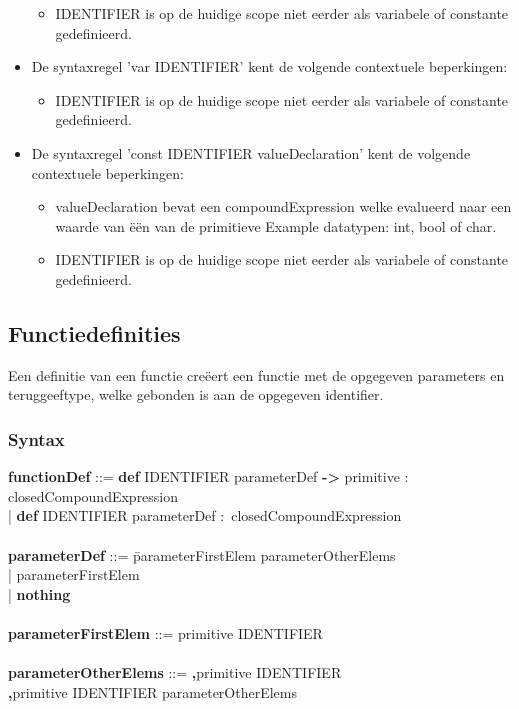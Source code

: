 \begin{itemize}
\begin{itemize}
            \item IDENTIFIER is op de huidige scope niet eerder als variabele of constante gedefinieerd.
            \end{itemize}  
        \item De syntaxregel 'var IDENTIFIER' kent de volgende contextuele beperkingen:
            \begin{itemize}
             \item IDENTIFIER is op de huidige scope niet eerder als variabele of constante gedefinieerd.
            \end{itemize}  
        \item De syntaxregel 'const IDENTIFIER valueDeclaration' kent de volgende contextuele beperkingen:
            \begin{itemize}
            \item valueDeclaration bevat een compoundExpression welke evalueerd naar een waarde van \"{e}\"{e}n van de primitieve Example datatypen: int, bool of char.
            \item IDENTIFIER is op de huidige scope niet eerder als variabele of constante gedefinieerd.
            \end{itemize}  
        \end{itemize}

\subsection{Functiedefinities}
Een definitie van een functie cre\"{e}ert een functie met de opgegeven parameters en teruggeeftype, welke gebonden is aan de opgegeven identifier.
    \subsubsection{Syntax}
        \begin{tabbing}
            {\bf functionDef}                 ::= \= \textbf{def} IDENTIFIER parameterDef \textbf{->} primitive \textbf{$\colon$} closedCompoundExpression\\
                                                  \>| \textbf{def} IDENTIFIER parameterDef \textbf{$\colon$} closedCompoundExpression\\
            \\
            {\bf parameterDef}                ::= \=parameterFirstElem parameterOtherElems\\
                                                  \>| parameterFirstElem\\
                                                  \>| \textbf{nothing}\\
            \\
            {\bf parameterFirstElem}          ::= primitive IDENTIFIER\\
            \\
            {\bf parameterOtherElems}         ::= \=\textbf{,}primitive IDENTIFIER\\
                                                  \>\textbf{,}primitive IDENTIFIER parameterOtherElems\\  
        \end{tabbing}
